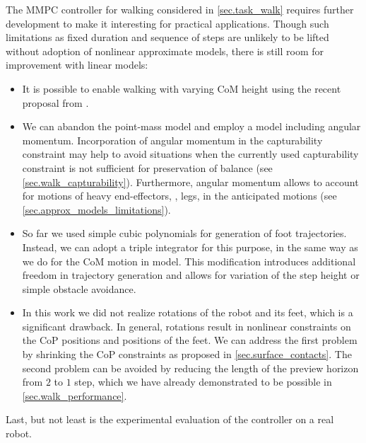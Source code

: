 The \ac{MMPC} controller for walking considered in \cref{sec.task_walk}
requires further development to make it interesting for practical applications.
Though such limitations as fixed duration and sequence of steps are unlikely to
be lifted without adoption of nonlinear approximate models, there is still room
for improvement with linear models:
%
\begin{itemize}
    \item It is possible to enable walking with varying \ac{CoM} height using
        the recent proposal from \cite{Brasseur2015humanoids}.

    \item We can abandon the point-mass model and employ a model including
        angular momentum. Incorporation of angular momentum in the
        capturability constraint may help to avoid situations when the
        currently used capturability constraint is not sufficient for
        preservation of balance (see \cref{sec.walk_capturability}).
        Furthermore, angular momentum allows to account for motions of heavy
        end-effectors, \EG, legs, in the anticipated motions (see
        \cref{sec.approx_models_limitations}).

    \item So far we used simple cubic polynomials for generation of foot
        trajectories. Instead, we can adopt a triple integrator for this
        purpose, in the same way as we do for the \ac{CoM} motion in
         model. This modification introduces additional
        freedom in trajectory generation and allows for variation of the step
        height or simple obstacle avoidance.

    \item In this work we did not realize rotations of the robot and its feet,
        which is a significant drawback. In general, rotations result in
        nonlinear constraints on the \ac{CoP} positions and positions of the
        feet. We can address the first problem by shrinking the \ac{CoP}
        constraints as proposed in \cref{sec.surface_contacts}. The second
        problem can be avoided by reducing the length of the preview horizon
        from $2$ to $1$ step, which we have already demonstrated to be possible
        in \cref{sec.walk_performance}.
\end{itemize}
%
Last, but not least is the experimental evaluation of the controller on a real
robot.


